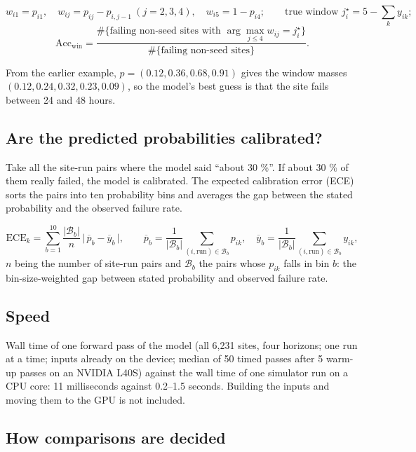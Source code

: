 \documentclass[11pt]{article}
\begin{document}
\begin{maths}
\[
w_{i1}=p_{i1},\quad w_{ij}=p_{ij}-p_{i,j-1}\ (j=2,3,4),\quad w_{i5}=1-p_{i4};\qquad
\text{true window } j^\star_i=5-\sum_k y_{ik};
\]
\[
\mathrm{Acc}_{\mathrm{win}}=\frac{\#\{\text{failing non-seed sites with }\arg\max_{j\le4}w_{ij}=j^\star_i\}}{\#\{\text{failing non-seed sites}\}}.
\]
\end{maths}

\begin{example}
From the earlier example, $p=(0.12,0.36,0.68,0.91)$ gives the window masses $(0.12,0.24,0.32,0.23,0.09)$, so the model's best guess is that the site fails between 24 and 48 hours.
\end{example}

\subsection{Are the predicted probabilities calibrated?}\label{sub:ece}

Take all the site-run pairs where the model said ``about 30 \%''. If about 30 \% of them really failed, the model is calibrated. The expected calibration error (ECE) sorts the pairs into ten probability bins and averages the gap between the stated probability and the observed failure rate.
\begin{maths}
\[
\mathrm{ECE}_k=\sum_{b=1}^{10}\frac{|\mathcal B_b|}{n}\,\Big|\,\overline{p}_{b}-\overline{y}_{b}\,\Big| ,\qquad \overline{p}_b=\frac{1}{|\mathcal B_b|}\sum_{(i,\text{run})\in\mathcal B_b}p_{ik},\quad \overline{y}_b=\frac{1}{|\mathcal B_b|}\sum_{(i,\text{run})\in\mathcal B_b}y_{ik},
\]
$n$ being the number of site-run pairs and $\mathcal B_b$ the pairs whose $p_{ik}$ falls in bin $b$: the bin-size-weighted gap between stated probability and observed failure rate.
\end{maths}

\subsection{Speed}

Wall time of one forward pass of the model (all 6,231 sites, four horizons; one run at a time; inputs already on the device; median of 50 timed passes after 5 warm-up passes on an NVIDIA L40S) against the wall time of one simulator run on a CPU core: 11 milliseconds against 0.2--1.5 seconds. Building the inputs and moving them to the GPU is not included.

\subsection{How comparisons are decided}
\end{document}
